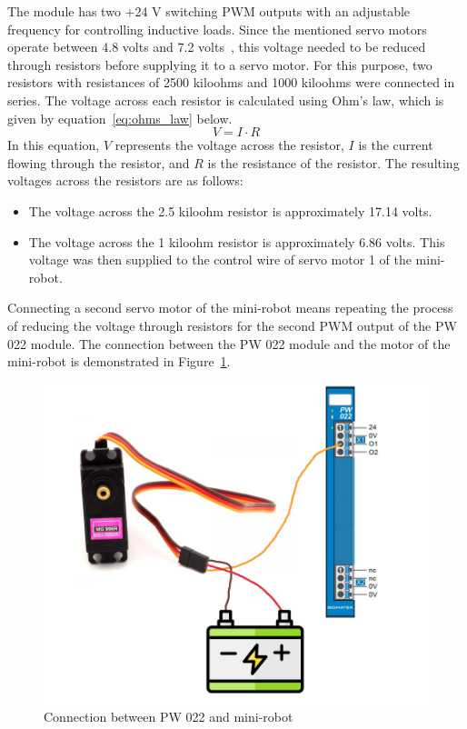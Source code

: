 \documentclass[MMR,Master,english]{twbook}
\begin{document}
\noindent The module has two +24 V switching PWM outputs with an adjustable frequency for controlling inductive loads. Since the mentioned servo motors operate between 4.8 volts and 7.2 volts~\cite{MG996RServoMotor}, this voltage needed to be reduced through resistors before supplying it to a servo motor. For this purpose, two resistors with resistances of 2500 kiloohms and 1000 kiloohms were connected in series. The voltage across each resistor is calculated using Ohm's law, which is given by equation~\ref{eq:ohms_law} below.
\begin{equation}
	\label{eq:ohms_law}
	V = I \cdot R
\end{equation}
In this equation, \(V\) represents the voltage across the resistor, \(I\) is the current flowing through the resistor, and \(R\) is the resistance of the resistor. The resulting voltages across the resistors are as follows:
\begin{itemize}
	\item The voltage across the 2.5 kiloohm resistor is approximately 17.14 volts.
	\item The voltage across the 1 kiloohm resistor is approximately 6.86 volts. This voltage was then supplied to the control wire of servo motor 1 of the mini-robot.
\end{itemize}

\noindent Connecting a second servo motor of the mini-robot means repeating the process of reducing the voltage through resistors for the second PWM output of the PW 022 module. The connection between the PW 022 module and the motor of the mini-robot is demonstrated in Figure~\ref{fig:pw022_minirobot_connection}.

\begin{figure}[H]
	\centering
	\includegraphics[width=0.7\columnwidth]{img/experiment/pw022_minirobot.png}
	\caption[Connection between PW 022 and mini-robot]{Connection between PW 022 and mini-robot~\cite{MG996RDigitalServo}}
	\label{fig:pw022_minirobot_connection}
\end{figure}
\end{document}
